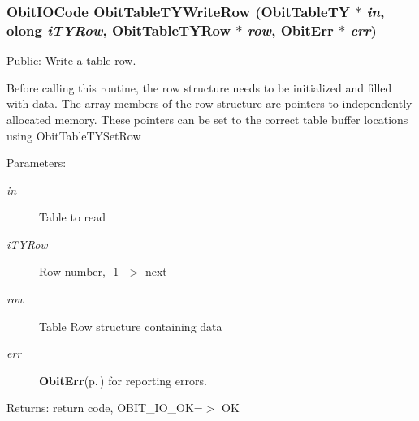 \subsubsection{\setlength{\rightskip}{0pt plus 5cm}Obit\-IOCode Obit\-Table\-TYWrite\-Row ({\bf Obit\-Table\-TY} $\ast$ {\em in}, {\bf olong} {\em i\-TYRow}, {\bf Obit\-Table\-TYRow} $\ast$ {\em row}, {\bf Obit\-Err} $\ast$ {\em err})}\label{ObitTableTY_8c_a24}


Public: Write a table row. 

Before calling this routine, the row structure needs to be initialized and filled with data. The array members of the row structure are pointers to independently allocated memory. These pointers can be set to the correct table buffer locations using Obit\-Table\-TYSet\-Row \begin{Desc}
\item[Parameters:]
\begin{description}
\item[{\em in}]Table to read \item[{\em i\-TYRow}]Row number, -1 -$>$ next \item[{\em row}]Table Row structure containing data \item[{\em err}]{\bf Obit\-Err}{\rm (p.\,\pageref{structObitErr})} for reporting errors. \end{description}
\end{Desc}
\begin{Desc}
\item[Returns:]return code, OBIT\_\-IO\_\-OK=$>$ OK \end{Desc}
